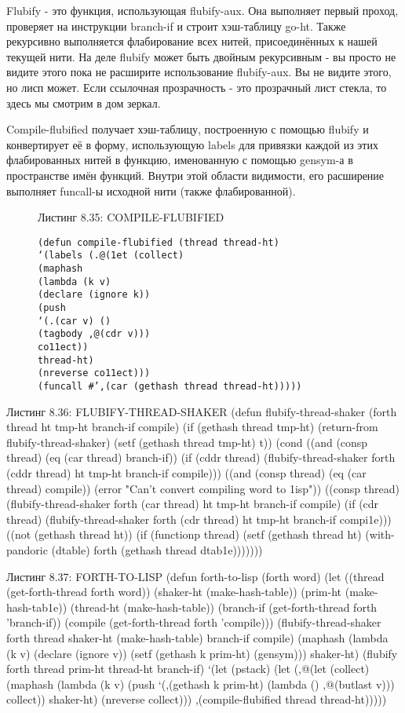 {{{Flubify - это функция, использующая flubify-aux. Она выполняет первый проход, проверяет на инструкции branch-if и строит хэш-таблицу go-ht. Также рекурсивно выполняется флабирование всех нитей, присоединённых к нашей текущей нити. На деле flubify может быть двойным рекурсивным - вы просто не видите этого пока не расширите использование flubify-aux. Вы не видите этого, но лисп может. Если ссылочная прозрачность - это прозрачный лист стекла, то здесь мы смотрим в дом зеркал.

Compile-flubified получает хэш-таблицу, построенную с помощью flubify и конвертирует её в форму, использующую labels для привязки каждой из этих флабированных нитей в функцию, именованную с помощью gensym-а в пространстве имён функций. Внутри этой области видимости, его расширение выполняет funcall-ы исходной нити (также флабированной).

\begin{figure}Листинг 8.35: COMPILE-FLUBIFIED\label{listing_8.35}
\listbegin
\begin{verbatim}
(defun compile-flubified (thread thread-ht)
‘(labels (.@(1et (collect)
(maphash
(lambda (k v)
(declare (ignore k))
(push
‘(.(car v) ()
(tagbody ,@(cdr v)))
co11ect))
thread-ht)
(nreverse co11ect)))
(funcall #’,(car (gethash thread thread-ht)))))
\end{verbatim}
\listend
\end{figure}

Листинг 8.36: FLUBIFY-THREAD-SHAKER
(defun flubify-thread-shaker
(forth thread ht tmp-ht branch-if compile)
(if (gethash thread tmp-ht)
(return-from flubify-thread-shaker)
(setf (gethash thread tmp-ht) t))
(cond
((and (consp thread) (eq (car thread) branch-if))
(if (cddr thread)
(flubify-thread-shaker
forth (cddr thread) ht
tmp-ht branch-if compile)))
((and (consp thread) (eq (car thread) compile))
(error "Can't convert compiling word to 1isp"))
((consp thread)
(flubify-thread-shaker
forth (car thread) ht
tmp-ht branch-if compile)
(if (cdr thread)
(flubify-thread-shaker
forth (cdr thread) ht
tmp-ht branch-if compi1e)))
((not (gethash thread ht))
(if (functionp thread)
(setf (gethash thread ht)
(with-pandoric (dtable) forth
(gethash thread dtab1e)))))))

Листинг 8.37: FORTH-TO-LISP
(defun forth-to-lisp (forth word)
(let ((thread (get-forth-thread forth word))
(shaker-ht (make-hash-table))
(prim-ht (make-hash-tab1e))
(thread-ht (make-hash-table))
(branch-if (get-forth-thread forth ’branch-if))
(compile (get-forth-thread forth ’compile)))
(flubify-thread-shaker
forth thread shaker-ht
(make-hash-table) branch-if compile)
(maphash (lambda (k v)
(declare (ignore v))
(setf (gethash k prim-ht) (gensym)))
shaker-ht)
(flubify forth thread prim-ht thread-ht branch-if)
‘(let (pstack)
(let (,@(let (collect)
(maphash
(lambda (k v)
(push ‘(,(gethash k prim-ht)
(lambda () ,@(butlast v)))
collect))
shaker-ht)
(nreverse collect)))
,(compile-flubified
thread thread-ht)))))

}}}

